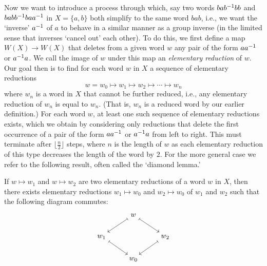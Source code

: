 Now we want to introduce a process through which, say two words \(bab^{-1} bb\)
and \(babb^{-1} baa^{-1}\) in \(X = \{a, b\}\) both simplify to the same word
\(bab\), i.e., we want the `inverse' \(a^{-1}\) of \(a\) to behave in a similar
manner as a group inverse (in the limited sense that inverses `cancel out' each
other). To do this, we first define a map \(W(X) \to W(X)\) that deletes from a
given word \(w\) any pair of the form \(aa^{-1}\) or \(a^{-1} a\). We call the
image of \(w\) under this map an \emph{elementary reduction} of \(w\). Our goal
then is to find for each word \(w\) in \(X\) a sequence of elementary reductions
\[
    w = w_0 \mapsto w_1 \mapsto w_2 \mapsto \cdots \mapsto w_n
\]
where \(w_n\) is a word in \(X\) that cannot be further reduced, i.e., any
elementary reduction of \(w_n\) is equal to \(w_n\). (That is, \(w_n\) is a
reduced word by our earlier definition.) For each word \(w\), at least one such
sequence of elementary reductions exists, which we obtain by considering only
reductions that delete the first occurrence of a pair of the form \(aa^{-1}\) or
\(a^{-1} a\) from left to right. This must terminate after \(\lfloor \frac{n}{2}
\rfloor\) steps, where \(n\) is the length of \(w\) as each elementary reduction
of this type decreases the length of the word by \(2\). For the more general
case we refer to the following result, often called the `diamond lemma.'

\begin{lemma}
    If \(w \mapsto w_1\) and \(w \mapsto w_2\) are two elementary reductions of
    a word \(w\) in \(X\), then there exists elementary reductions \(w_1 \mapsto
    w_0\) and \(w_2 \mapsto w_0\) of \(w_1\) and \(w_2\) such that the following
    diagram commutes:
    \[
        \begin{tikzcd}
            & w \arrow[ld, maps to] \arrow[rd, maps to] &                \\
            w_1 \arrow[rd, maps to] &                         & w_2 \arrow[ld, maps to] \\
                        & w_0                     &               
        \end{tikzcd}
    \]
\end{lemma}

